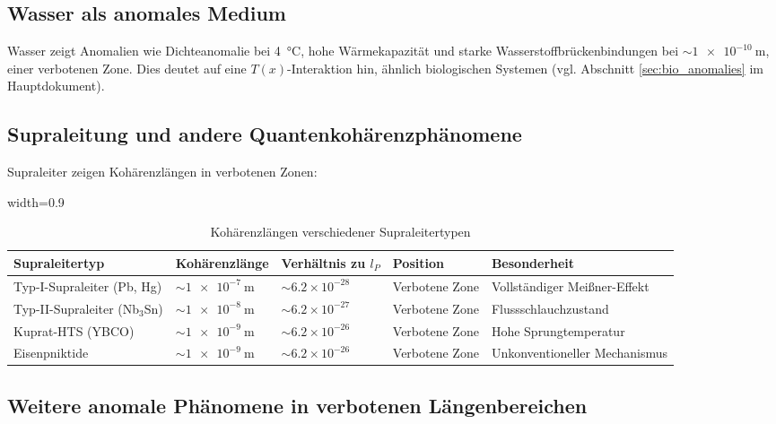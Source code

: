 \documentclass[12pt,a4paper]{article}
\newcommand{\Tfield}{T(x)}
\newcommand{\tablescale}{0.9}
\begin{document}
	\subsection{Wasser als anomales Medium}
	\label{subsec:wasser_anomal}
	
	Wasser zeigt Anomalien wie Dichteanomalie bei \SI{4}{\celsius}, hohe Wärmekapazität und starke Wasserstoffbrückenbindungen bei $\sim \SI{1e-10}{\meter}$, einer verbotenen Zone. Dies deutet auf eine \(\Tfield\)-Interaktion hin, ähnlich biologischen Systemen (vgl. Abschnitt \ref{sec:bio_anomalies} im Hauptdokument).
	
	\subsection{Supraleitung und andere Quantenkohärenzphänomene}
	\label{subsec:supraleitung}
	
	Supraleiter zeigen Kohärenzlängen in verbotenen Zonen:
	
	\begin{table}[H]
		\centering
		\begin{adjustbox}{width=\tablescale\textwidth}
			\begin{tabular}{lllll}
				\toprule
				\textbf{Supraleitertyp} & \textbf{Kohärenzlänge} & \textbf{Verhältnis zu $l_P$} & \textbf{Position} & \textbf{Besonderheit} \\
				\midrule
				Typ-I-Supraleiter (Pb, Hg) & $\sim \SI{1e-7}{\meter}$ & $\sim 6.2 \times 10^{-28}$ & Verbotene Zone & Vollständiger Meißner-Effekt \\
				Typ-II-Supraleiter (Nb$_3$Sn) & $\sim \SI{1e-8}{\meter}$ & $\sim 6.2 \times 10^{-27}$ & Verbotene Zone & Flussschlauchzustand \\
				Kuprat-HTS (YBCO) & $\sim \SI{1e-9}{\meter}$ & $\sim 6.2 \times 10^{-26}$ & Verbotene Zone & Hohe Sprungtemperatur \\
				Eisenpniktide & $\sim \SI{1e-9}{\meter}$ & $\sim 6.2 \times 10^{-26}$ & Verbotene Zone & Unkonventioneller Mechanismus \\
				\bottomrule
			\end{tabular}
		\end{adjustbox}
		\caption{Kohärenzlängen verschiedener Supraleitertypen}
		\label{tab:supercond}
	\end{table}
	
	\subsection{Weitere anomale Phänomene in verbotenen Längenbereichen}
	\label{subsec:weitere_anomale_phaenomene}
	
\end{document}
